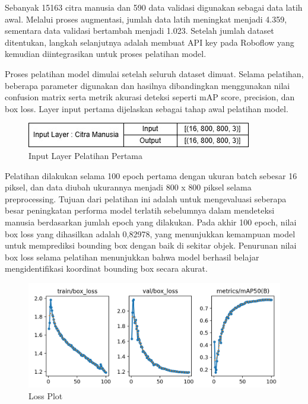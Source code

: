 Sebanyak 15163 citra manusia dan 590 data validasi digunakan sebagai data latih awal. Melalui proses augmentasi, jumlah data latih meningkat menjadi 4.359, sementara data validasi bertambah menjadi 1.023. Setelah jumlah dataset ditentukan, langkah selanjutnya adalah membuat API key pada Roboflow yang kemudian diintegrasikan untuk proses pelatihan model.

Proses pelatihan model dimulai setelah seluruh dataset dimuat. Selama pelatihan, beberapa parameter digunakan dan hasilnya dibandingkan menggunakan nilai confusion matrix serta metrik akurasi deteksi seperti mAP score, precision, dan box loss. Layer input pertama dijelaskan sebagai tahap awal pelatihan model.

\begin{figure}[H]
    \centering
    \includegraphics[scale=0.6]{gambar/inputlayerbab4.jpg}
    \caption{Input Layer Pelatihan Pertama}
    \label{fig:Input Layer Pelatihan Pertama}
\end{figure}

Pelatihan dilakukan selama 100 epoch pertama dengan ukuran batch sebesar 16 piksel, dan data diubah ukurannya menjadi 800 x 800 piksel selama preprocessing. Tujuan dari pelatihan ini adalah untuk mengevaluasi seberapa besar peningkatan performa model terlatih sebelumnya dalam mendeteksi manusia berdasarkan jumlah epoch yang dilakukan. Pada akhir 100 epoch, nilai box loss yang dihasilkan adalah 0,82978, yang menunjukkan kemampuan model untuk memprediksi bounding box dengan baik di sekitar objek. Penurunan nilai box loss selama pelatihan menunjukkan bahwa model berhasil belajar mengidentifikasi koordinat bounding box secara akurat.

\begin{figure}[H]
    \centering
    \includegraphics[scale=0.4]{gambar/loss.png}
    \caption{Loss Plot}
    \label{fig:Loss Plot}
\end{figure}

